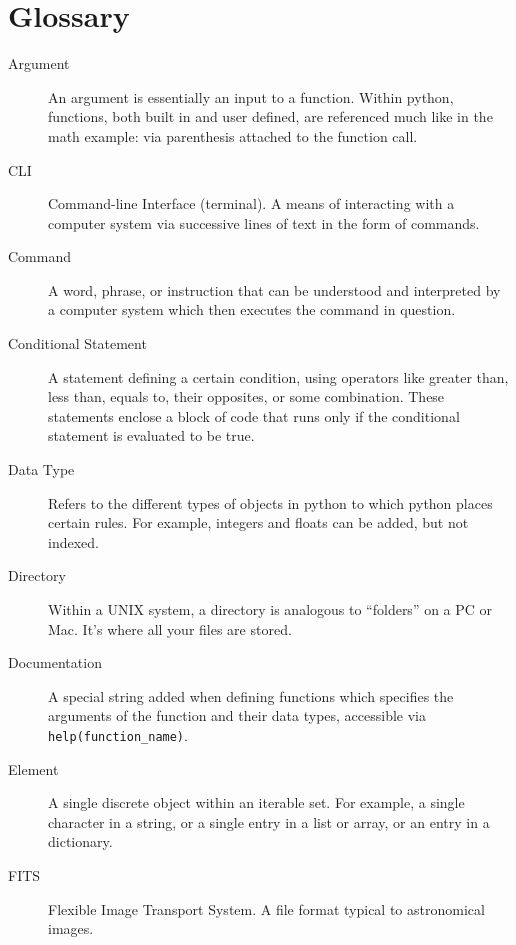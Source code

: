 \chapter{Glossary} %

\begin{description}
    \item[Argument] An argument is essentially an input to a function. %
    Within python, functions, both built in and user defined, are referenced much like in the math example: via parenthesis attached to the function call. %

    \item[CLI] Command-line Interface (terminal). A means of interacting with a computer system via successive lines of text in the form of commands. %

    \item[Command] A word, phrase, or instruction that can be understood and interpreted by a computer system which then executes the command in question. %

    \item[Conditional Statement] A statement defining a certain condition, using operators like greater than, less than, equals to, their opposites, or some combination. %
    These statements enclose a block of code that runs only if the conditional statement is evaluated to be true. %

    \item[Data Type] Refers to the different types of objects in python to which python places certain rules. %
    For example, integers and floats can be added, but not indexed. %

    \item[Directory] Within a UNIX system, a directory is analogous to ``folders'' on a PC or Mac. %
    It's where all your files are stored. %

    \item[Documentation] A special string added when defining functions which specifies the arguments of the function and their data types, accessible via \texttt{help(function\_name)}. %

    \item[Element] A single discrete object within an iterable set. For example, a single character in a string, or a single entry in a list or array, or an entry in a dictionary. %

    \item[FITS] Flexible Image Transport System. A file format typical to astronomical images. %


\end{description}
